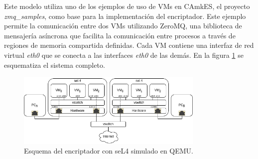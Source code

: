 Este modelo utiliza uno de los ejemplos de uso de VMs en CAmkES, el proyecto \textit{zmq\_samples}, como base para la implementación del encriptador. Este ejemplo permite la comunicación entre dos VMs utilizando ZeroMQ, una biblioteca de mensajería asíncrona que facilita la comunicación entre procesos a través de regiones de memoria compartida definidas. Cada VM contiene una interfaz de red virtual \textit{eth0} que se conecta a las interfaces \textit{eth0} de las demás. En la figura \ref{diag:model4} se esquematiza el sistema completo.

\begin{figure}[h!]
    \centering
    \includegraphics[width=0.8\textwidth]{../figs/3_model4.png}
    \caption{Esquema del encriptador con seL4 simulado en QEMU.}
    \label{diag:model4}
\end{figure}


